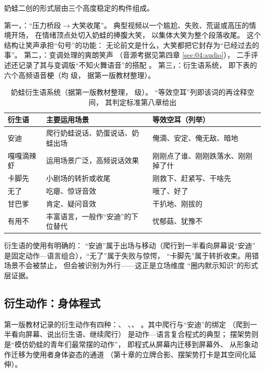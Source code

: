 奶蛙二创的形式层由三个高度稳定的构件组成。

第一，：“压力桥段$\to$大笑收尾”。
典型视频以一个尴尬、失败、荒诞或高压的情境开场，
在情绪顶点处切入奶蛙的捧腹大笑，
以集体大笑为整个段落收尾\cite{shoutanji2026naiwa}。
这个结构让笑声承担“句号”的功能：
无论前文是什么，大笑都把它封存为“已经过去的事”。
第二，：变调处理的爽朗笑声
（音源考据见第四章 \ref{sec:04:audio}），
二手评述还记录了其与变调版“不知火舞语音”的搭配
\cite{shoutanji2026naiwa}。
第三，：衍生语系统，
即下表的六个高频语音梗（均  级，
据第一版教材整理）。

\begin{table}[htbp]\centering
  \caption{奶蛙衍生语系统（据第一版教材整理， 级）。
          “等效空耳”列即该词的再诠释空间，
          其判定标准第八章给出}
  \label{tab:06:langs}
  \small
  \begin{tabularx}{\textwidth}{@{}llX@{}}
    \toprule
    衍生语 & 主要运用场景 & 等效空耳（列举） \\ \midrule
    安迪 & 爬行奶蛙说话、奶蛋说话、奶蛙出场 &
      俺滴、安定、俺无敌、暗地 \\
    嘎嘎滴辣虾 & 运用场景广泛，高频说话效果 &
      刚刚点了谁、刚刚跌落水、刚刚掉了什 \\
    卡脚先 & 小剧场的转折或收尾 &
      刚救下、赶紧写、干啥先 \\
    无了 & 吃瘪、惊讶音效 & 哦了、好了 \\
    甘巴爹 & 肯定、疑问音效 & 干扒地、刚拔的 \\
    有用不 & 丰富语言，一般作“安迪”的下位替代 &
      忧郁菇、犹豫不 \\ \bottomrule
  \end{tabularx}
\end{table}

衍生语的使用有明确的：
“安迪”属于出场与移动（爬行到一半看向屏幕说“安迪”
是固定动作—语言组合），“无了”属于失败与惊愕，
“卡脚先”属于转折收束。用错场景不会被禁止，
但会被识别为外行——这正是立场维度
“圈内默示知识”的形式层证据。

\subsection{衍生动作：身体程式}

第一版教材记录的衍生动作有四种：、
、、
。其中爬行与“安迪”的绑定
（爬到一半看向屏幕、说出衍生语、继续爬行）
是动作—语言复合程式的典型；
摆架势则是“模仿奶蛙的青年们最常摆的动作”，
即程式从屏幕内迁移到屏幕外、
从形象动作迁移为使用者身体姿态的通道
（第十章的立牌合影、摆架势打卡是其空间化延伸）。

